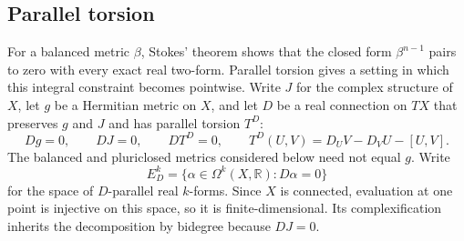 \subsection{Parallel torsion}

For a balanced metric $\beta$, Stokes' theorem shows that the closed form $\beta^{n-1}$ pairs to zero with every exact real two-form. Parallel torsion gives a setting in which this integral constraint becomes pointwise. Write $J$ for the complex structure of $X$, let $g$ be a Hermitian metric on $X$, and let $D$ be a real connection on $TX$ that preserves $g$ and $J$ and has parallel torsion $T^D$:
\[
 Dg=0,\qquad DJ=0,\qquad DT^D=0,
 \qquad T^D(U,V)=D_UV-D_VU-[U,V].
\]
The balanced and pluriclosed metrics considered below need not equal $g$. Write
\[
 E_D^k=\{\alpha\in\Omega^k(X,\mathbb R):D\alpha=0\}
\]
for the space of $D$-parallel real $k$-forms. Since $X$ is connected, evaluation at one point is injective on this space, so it is finite-dimensional. Its complexification inherits the decomposition by bidegree because $DJ=0$.


